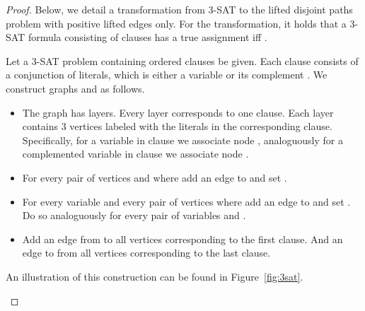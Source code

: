 \documentclass{article}
\begin{document}
\threesatreduction*

\begin{proof}

Below, we detail a transformation from 3-SAT to the lifted disjoint paths problem with positive lifted edges only. For the transformation, it holds that a 3-SAT formula consisting of  clauses has a true assignment iff .
 
 
 
Let a 3-SAT problem containing  ordered clauses  be given.
Each clause  consists of a conjunction of literals, which is either a variable  or its complement .
We construct graphs  and  as follows. 
\begin{itemize}
 \item The graph  has  layers. Every layer corresponds to one clause. Each layer contains 3 vertices labeled with the literals in the corresponding clause.
 Specifically, for a variable  in clause  we associate node , analoguously for a complemented variable  in clause  we associate node .
 \item For every pair of vertices  and  where  add an edge  to  and set .
 \item For every variable  and every pair of vertices  where  add an edge  to  and set .
 Do so analoguously for every pair of variables  and .
 \item Add an edge from  to all vertices corresponding to the first clause.
 And an edge to  from all vertices corresponding to the last clause.
\end{itemize}
An illustration of this construction can be found in Figure~\ref{fig:3sat}.
     


\begin{figure}
\end{figure}
\end{proof}
\end{document}
